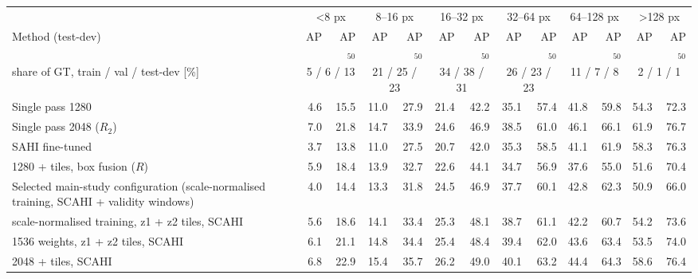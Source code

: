 \begin{tabular}{lrrrrrrrrrrrr}
\toprule
 & \multicolumn{2}{c}{<8 px} & \multicolumn{2}{c}{8--16 px} & \multicolumn{2}{c}{16--32 px} & \multicolumn{2}{c}{32--64 px} & \multicolumn{2}{c}{64--128 px} & \multicolumn{2}{c}{>128 px} \\
\cmidrule(lr){2-3}\cmidrule(lr){4-5}\cmidrule(lr){6-7}\cmidrule(lr){8-9}\cmidrule(lr){10-11}\cmidrule(lr){12-13}
Method (test-dev) & AP & AP$_{50}$ & AP & AP$_{50}$ & AP & AP$_{50}$ & AP & AP$_{50}$ & AP & AP$_{50}$ & AP & AP$_{50}$ \\
share of GT, train / val / test-dev [\%] & \multicolumn{2}{c}{\scriptsize 5 / 6 / 13} & \multicolumn{2}{c}{\scriptsize 21 / 25 / 23} & \multicolumn{2}{c}{\scriptsize 34 / 38 / 31} & \multicolumn{2}{c}{\scriptsize 26 / 23 / 23} & \multicolumn{2}{c}{\scriptsize 11 / 7 / 8} & \multicolumn{2}{c}{\scriptsize 2 / 1 / 1} \\ \midrule
\midrule
Single pass 1280 & 4.6 & 15.5 & 11.0 & 27.9 & 21.4 & 42.2 & 35.1 & 57.4 & 41.8 & 59.8 & 54.3 & 72.3 \\
Single pass 2048 ($R_2$) & 7.0 & 21.8 & 14.7 & 33.9 & 24.6 & 46.9 & 38.5 & 61.0 & 46.1 & 66.1 & 61.9 & 76.7 \\
SAHI fine-tuned & 3.7 & 13.8 & 11.0 & 27.5 & 20.7 & 42.0 & 35.3 & 58.5 & 41.1 & 61.9 & 58.3 & 76.3 \\
1280 + tiles, box fusion ($R$) & 5.9 & 18.4 & 13.9 & 32.7 & 22.6 & 44.1 & 34.7 & 56.9 & 37.6 & 55.0 & 51.6 & 70.4 \\
Selected main-study configuration (scale-normalised training, SCAHI + validity windows) & 4.0 & 14.4 & 13.3 & 31.8 & 24.5 & 46.9 & 37.7 & 60.1 & 42.8 & 62.3 & 50.9 & 66.0 \\
scale-normalised training, z1 + z2 tiles, SCAHI & 5.6 & 18.6 & 14.1 & 33.4 & 25.3 & 48.1 & 38.7 & 61.1 & 42.2 & 60.7 & 54.2 & 73.6 \\
1536 weights, z1 + z2 tiles, SCAHI & 6.1 & 21.1 & 14.8 & 34.4 & 25.4 & 48.4 & 39.4 & 62.0 & 43.6 & 63.4 & 53.5 & 74.0 \\
2048 + tiles, SCAHI & 6.8 & 22.9 & 15.4 & 35.7 & 26.2 & 49.0 & 40.1 & 63.2 & 44.4 & 64.3 & 58.6 & 76.4 \\
\bottomrule
\end{tabular}
